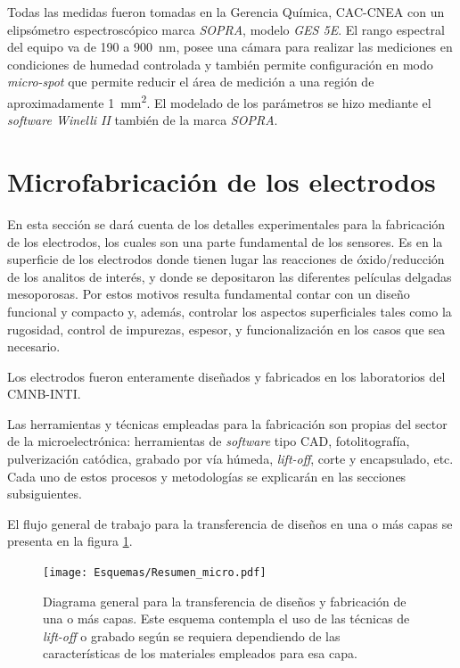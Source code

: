 		Todas las medidas fueron tomadas en la Gerencia Química, CAC-CNEA con un elipsómetro espectroscópico marca \textit{SOPRA}, modelo \textit{GES 5E}. El rango espectral del equipo va de 190 a \SI{900}{\nm}, posee una cámara para realizar las mediciones en condiciones de humedad controlada y también permite configuración en modo \textit{micro-spot} que permite reducir el área de medición a una región de aproximadamente \SI{1}{\mm^2}. El modelado de los parámetros se hizo mediante el \textit{software Winelli II} también de la marca \textit{SOPRA}.
			
\section{Microfabricación de los electrodos}
		
	 En esta sección se dará cuenta de los detalles experimentales para la fabricación de los electrodos, los cuales son una parte fundamental de los sensores. Es en la superficie de los electrodos donde tienen lugar las reacciones de óxido/reducción de los analitos de interés, y donde se depositaron las diferentes películas delgadas mesoporosas. Por estos motivos resulta fundamental contar con un diseño funcional y compacto y, además, controlar los aspectos superficiales tales como la rugosidad, control de impurezas, espesor, y funcionalización en los casos que sea necesario.

	 Los electrodos fueron enteramente diseñados y fabricados en los laboratorios del CMNB-INTI. 
		
	 Las herramientas y técnicas empleadas para la fabricación son propias del sector de la microelectrónica: herramientas de \textit{software} tipo CAD, fotolitografía, pulverización catódica, grabado por vía húmeda, \textit{lift-off}, corte y encapsulado, etc.\cite{Franssila2004,Jaeger2001} Cada uno de estos procesos y metodologías se explicarán en las secciones subsiguientes. 

	 El flujo general de trabajo para la transferencia de diseños en una o más capas se presenta en la figura \ref{esq:micro}.
			
			 \begin{figure}[t!]
			  \begin{center}
			  \texttt{[image: Esquemas/Resumen\_micro.pdf]}
			  \caption[Esquema para la transferencia de diseños]{Diagrama general para la transferencia de diseños y fabricación  de una o más capas. Este esquema contempla el uso de las técnicas de \textit{lift-off }o grabado según se requiera dependiendo de las características de los materiales empleados para esa capa.}
			  \label{esq:micro}
			  \end{center}
			  \end{figure}

